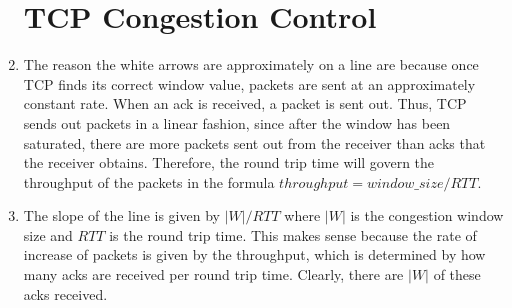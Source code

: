 \documentclass[psamsfonts]{amsart}
\begin{document}
\begin{enumerate}
    \section{TCP Congestion Control}
  \item The reason the white arrows are approximately on a line are because once TCP finds its correct window value, packets are sent at an approximately constant rate. When an ack is received, a packet is sent out. Thus, TCP sends out packets in a linear fashion, since after the window has been saturated, there are more packets sent out from the receiver than acks that the receiver obtains. Therefore, the round trip time will govern the throughput of the packets in the formula $throughput = window\_size/RTT$.
  \item The slope of the line is given by $|W| / RTT$ where $|W|$ is the congestion window size and $RTT$ is the round trip time. This makes sense because the rate of increase of packets is given by the throughput, which is determined by how many acks are received per round trip time. Clearly, there are $|W|$ of these acks received.

\end{enumerate}
\end{document}
